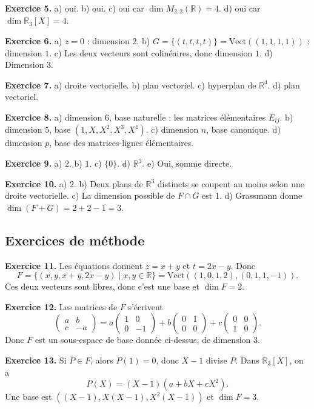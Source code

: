 \documentclass[11pt,a4paper]{article}
\newcommand{\R}{\mathbb R}
\newcommand{\Vect}{\mathrm{Vect}}
\begin{document}
\textbf{Exercice 5.} a) oui. b) oui. c) oui car $\dim M_{2,2}(\R)=4$. d) oui car $\dim \R_3[X]=4$.

\textbf{Exercice 6.} a) $z=0$ : dimension $2$. b) $G=\{(t,t,t,t)\}=\Vect((1,1,1,1))$ : dimension $1$. c) Les deux vecteurs sont colinéaires, donc dimension $1$. d) Dimension $3$.

\textbf{Exercice 7.} a) droite vectorielle. b) plan vectoriel. c) hyperplan de $\R^4$. d) plan vectoriel.

\textbf{Exercice 8.} a) dimension $6$, base naturelle : les matrices élémentaires $E_{ij}$. b) dimension $5$, base $(1,X,X^2,X^3,X^4)$. c) dimension $n$, base canonique. d) dimension $p$, base des matrices-lignes élémentaires.

\textbf{Exercice 9.} a) $2$. b) $1$. c) $\{0\}$. d) $\R^3$. e) Oui, somme directe.

\textbf{Exercice 10.} a) $2$. b) Deux plans de $\R^3$ distincts se coupent au moins selon une droite vectorielle. c) La dimension possible de $F\cap G$ est $1$. d) Grassmann donne $\dim(F+G)=2+2-1=3$.

\subsection*{Exercices de méthode}
\textbf{Exercice 11.} Les équations donnent $z=x+y$ et $t=2x-y$. Donc
\[F=\{(x,y,x+y,2x-y)\mid x,y\in\R\}=\Vect((1,0,1,2),(0,1,1,-1)).\]
Ces deux vecteurs sont libres, donc c'est une base et $\dim F=2$.

\textbf{Exercice 12.} Les matrices de $F$ s'écrivent
\[\begin{pmatrix}a&b\\ c&-a\end{pmatrix}=a\begin{pmatrix}1&0\\0&-1\end{pmatrix}+b\begin{pmatrix}0&1\\0&0\end{pmatrix}+c\begin{pmatrix}0&0\\1&0\end{pmatrix}.\]
Donc $F$ est un sous-espace de base donnée ci-dessus, de dimension $3$.

\textbf{Exercice 13.} Si $P\in F$, alors $P(1)=0$, donc $X-1$ divise $P$. Dans $\R_3[X]$, on a
\[P(X)=(X-1)(a+bX+cX^2).
\]
Une base est $((X-1),X(X-1),X^2(X-1))$ et $\dim F=3$.
\end{document}
